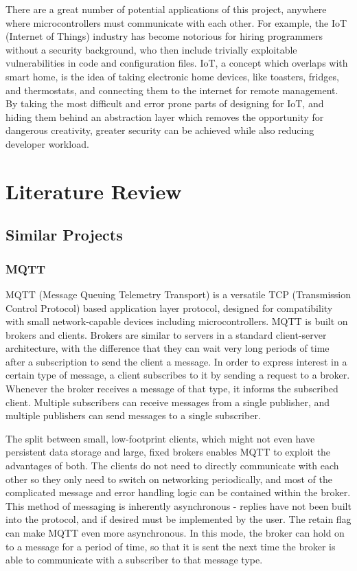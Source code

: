 \documentclass{article}
\begin{document}
There are a great number of potential applications of this project, anywhere where microcontrollers must communicate with each other. For example, the IoT (Internet of Things) industry has become notorious for hiring programmers without a security background, who then include trivially exploitable vulnerabilities in code and configuration files\cite{internetofsh}. IoT, a concept which overlaps with smart home, is the idea of taking electronic home devices, like toasters, fridges, and thermostats, and connecting them to the internet for remote management. By taking the most difficult and error prone parts of designing for IoT, and hiding them behind an abstraction layer which removes the opportunity for dangerous creativity, greater security can be achieved while also reducing developer workload.

\section{Literature Review}
\subsection{Similar Projects}
\subsubsection{MQTT}
MQTT (Message Queuing Telemetry Transport) is a versatile TCP (Transmission Control Protocol) based application layer protocol\cite{MQTT}, designed for compatibility with small network-capable devices including microcontrollers. MQTT is built on brokers and clients. Brokers are similar to servers in a standard client-server architecture, with the difference that they can wait very long periods of time after a subscription to send the client a message. In order to express interest in a certain type of message, a client subscribes to it by sending a request to a broker. Whenever the broker receives a message of that type, it informs the subscribed client. Multiple subscribers can receive messages from a single publisher, and multiple publishers can send messages to a single subscriber.

The split between small, low-footprint clients, which might not even have persistent data storage and large, fixed brokers enables MQTT to exploit the advantages of both. The clients do not need to directly communicate with each other so they only need to switch on networking periodically, and most of the complicated message and error handling logic can be contained within the broker. This method of messaging is inherently asynchronous - replies have not been built into the protocol, and if desired must be implemented by the user. The retain flag can make MQTT even more asynchronous. In this mode, the broker can hold on to a message for a period of time, so that it is sent the next time the broker is able to communicate with a subscriber to that message type. 
\end{document}
